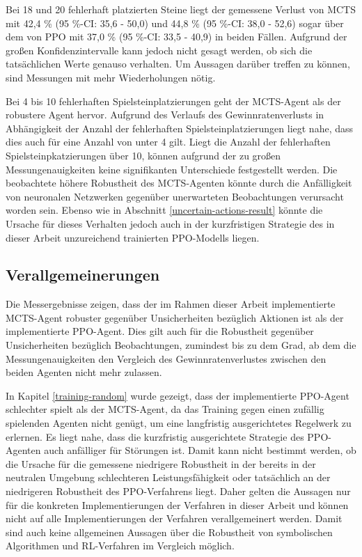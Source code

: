 Bei 18 und 20 fehlerhaft platzierten Steine liegt der gemessene Verlust von MCTS mit 42,4 \% (95 \%-CI: 35,6 - 50,0) und 44,8 \% (95 \%-CI: 38,0 - 52,6) sogar über dem von PPO mit 37,0 \% (95 \%-CI: 33,5 - 40,9) in beiden Fällen. Aufgrund der großen Konfidenzintervalle kann jedoch nicht gesagt werden, ob sich die tatsächlichen Werte genauso verhalten. Um Aussagen darüber treffen zu können, sind Messungen mit mehr Wiederholungen nötig.

Bei 4 bis 10 fehlerhaften Spielsteinplatzierungen geht der MCTS-Agent als der robustere Agent hervor. Aufgrund des Verlaufs des Gewinnratenverlusts in Abhängigkeit der Anzahl der fehlerhaften Spielsteinplatzierungen liegt nahe, dass dies auch für eine Anzahl von unter 4 gilt. Liegt die Anzahl der fehlerhaften Spielsteinpkatzierungen über 10, können aufgrund der zu großen Messungenauigkeiten keine signifikanten Unterschiede festgestellt werden. Die beobachtete höhere Robustheit des MCTS-Agenten könnte durch die Anfälligkeit von neuronalen Netzwerken gegenüber unerwarteten Beobachtungen verursacht worden sein. Ebenso wie in Abschnitt \ref{uncertain-actions-result} könnte die Ursache für dieses Verhalten jedoch auch in der kurzfristigen Strategie des in dieser Arbeit unzureichend trainierten PPO-Modells liegen.

\subsection{Verallgemeinerungen}

Die Messergebnisse zeigen, dass der im Rahmen dieser Arbeit implementierte MCTS-Agent robuster gegenüber Unsicherheiten bezüglich Aktionen ist als der implementierte PPO-Agent. Dies gilt auch für die Robustheit gegenüber Unsicherheiten bezüglich Beobachtungen, zumindest bis zu dem Grad, ab dem die Messungenauigkeiten den Vergleich des Gewinnratenverlustes zwischen den beiden Agenten nicht mehr zulassen.

In Kapitel \ref{training-random} wurde gezeigt, dass der implementierte PPO-Agent schlechter spielt als der MCTS-Agent, da das Training gegen einen zufällig spielenden Agenten nicht genügt, um eine langfristig ausgerichtetes Regelwerk zu erlernen. Es liegt nahe, dass die kurzfristig ausgerichtete Strategie des PPO-Agenten auch anfälliger für Störungen ist. Damit kann nicht bestimmt werden, ob die Ursache für die gemessene niedrigere Robustheit in der bereits in der neutralen Umgebung schlechteren Leistungsfähigkeit oder tatsächlich an der niedrigeren Robustheit des PPO-Verfahrens liegt. Daher gelten die Aussagen nur für die konkreten Implementierungen der Verfahren in dieser Arbeit und können nicht auf alle Implementierungen der Verfahren verallgemeinert werden. Damit sind auch keine allgemeinen Aussagen über die Robustheit von symbolischen Algorithmen und RL-Verfahren im Vergleich möglich.

